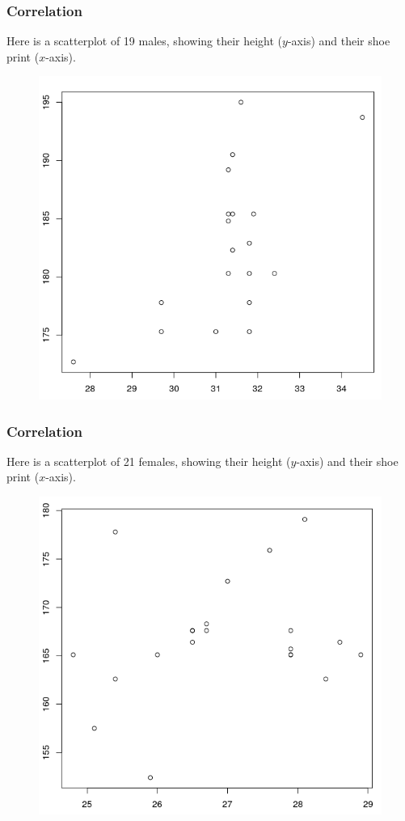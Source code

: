 \documentclass[xcolor=dvipsnames]{beamer}
\begin{document}
\begin{frame}
  \frametitle{Correlation}
  Here is a scatterplot of 19 males, showing their height ($y$-axis)
  and their shoe print ($x$-axis).
  \begin{figure}[h]
    \includegraphics[scale=0.35]{./diagrams/mshoeprintheight.png}
  \end{figure}
\end{frame}

\begin{frame}
  \frametitle{Correlation}
  Here is a scatterplot of 21 females, showing their height ($y$-axis)
  and their shoe print ($x$-axis).
  \begin{figure}[h]
    \includegraphics[scale=0.35]{./diagrams/fshoeprintheight.png}
  \end{figure}
\end{frame}
\end{document}
